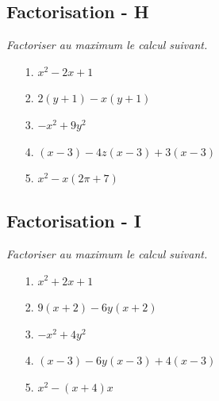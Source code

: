 \documentclass[paper=a4, fontsize=9pt]{scrartcl} %
\begin{document}
\begin{multicols}{2}

  \subsection*{Factorisation - H}
  \textit{Factoriser au maximum le calcul suivant.}

  \begin{enumerate}
  \item[1.] $x^2 -2x + 1$
  \item[2.] $2(y + 1) - x(y + 1)$
  \item[3.] $-x^2 + 9y^2$
  \item[4.] $(x - 3) - 4z(x - 3) + 3(x - 3)$
  \item[5.] $x^2 - x(2\pi + 7)$
  \end{enumerate}

  \subsection*{Factorisation - I}
  \textit{Factoriser au maximum le calcul suivant.}

  \begin{enumerate}
  \item[1.] $x^2 +2x + 1$
  \item[2.] $9(x + 2) - 6y(x + 2)$
  \item[3.] $-x^2 + 4y^2$
  \item[4.] $(x - 3) - 6y(x - 3) + 4(x - 3)$
  \item[5.] $x^2 - (x + 4)x$
  \end{enumerate}

\end{multicols}
\end{document}
